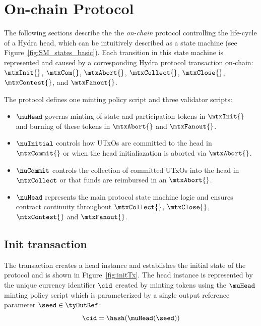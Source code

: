 \clearpage
\section{On-chain Protocol}\label{sec:on-chain}


The following sections describe the the \emph{on-chain} protocol controlling the
life-cycle of a Hydra head, which can be intuitively described as a state
machine (see Figure~\ref{fig:SM_states_basic}). Each transition in this state
machine is represented and caused by a corresponding Hydra protocol transaction
on-chain: $\mtxInit{}$, $\mtxCom{}$, $\mtxAbort{}$, $\mtxCollect{}$,
$\mtxClose{}$, $\mtxContest{}$, and $\mtxFanout{}$.


\noindent The protocol defines one minting policy script and three validator scripts:
\begin{itemize}
	\item $\muHead$ governs minting of state and participation tokens in
	      $\mtxInit{}$ and burning of these tokens in $\mtxAbort{}$ and
	      $\mtxFanout{}$.
	\item $\nuInitial$ controls how UTxOs are committed to the head in
	      $\mtxCommit{}$ or when the head initialiazation is aborted via
	      $\mtxAbort{}$.
	\item $\nuCommit$ controls the collection of committed UTxOs into the head in
	      $\mtxCollect$ or that funds are reimbursed in an $\mtxAbort{}$.
	\item $\nuHead$ represents the main protocol state machine logic and ensures
	      contract continuity throughout $\mtxCollect{}$, $\mtxClose{}$,
	      $\mtxContest{}$ and $\mtxFanout{}$.
\end{itemize}

\subsection{Init transaction}\label{sec:init-tx}

The \mtxInit{} transaction creates a head instance and establishes the initial
state of the protocol and is shown in Figure~\ref{fig:initTx}. The head
instance is represented by the unique currency identifier $\cid$ created by
minting tokens using the $\muHead$ minting policy script which is parameterized
by a single output reference parameter $\seed \in \tyOutRef$:
\[
	\cid = \hash(\muHead(\seed))
\]

